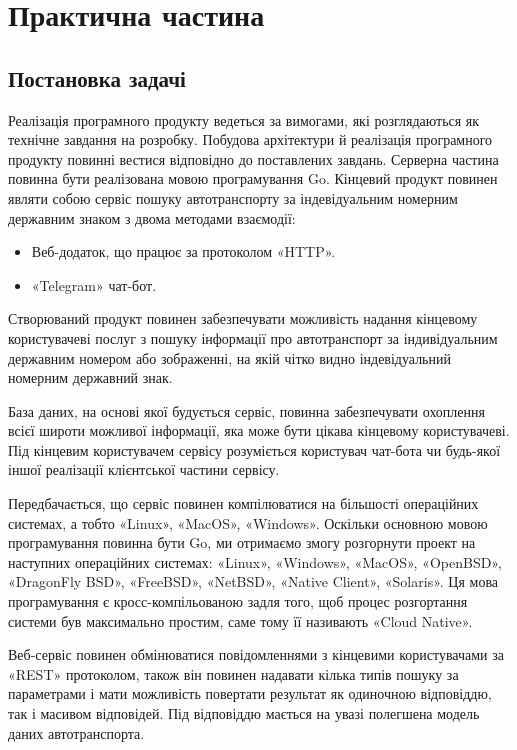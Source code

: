 
\chapter{Практична частина}

\section{Постановка задачі}

Реалізація програмного продукту ведеться за вимогами, які розглядаються як технічне завдання на розробку. Побудова архітектури й реалізація програмного
продукту повинні вестися відповідно до поставлених завдань.
Серверна частина повинна бути реалізована мовою програмування Go.
Кінцевий продукт повинен являти собою сервіс пошуку автотранспорту
за індевідуальним номерним державним знаком з двома методами
взаємодії:

\begin{itemize}
  \item Веб-додаток, що працює за протоколом «HTTP».
  \item «Telegram» чат-бот.
\end{itemize}

Створюваний продукт повинен забезпечувати можливість
надання кінцевому користувачеві послуг з пошуку інформації про
автотранспорт за індивідуальним державним номером
або зображенні, на якій чітко видно
індевідуальний номерним державний знак.

База даних, на основі якої будується сервіс, повинна
забезпечувати охоплення всієї широти можливої ​​інформації, яка може бути
цікава кінцевому користувачеві. Під кінцевим користувачем сервісу
розуміється користувач чат-бота чи будь-якої іншої реалізації клієнтської частини сервісу.

Передбачається, що сервіс повинен компілюватися на більшості операційних системах,
а тобто «Linux», «MacOS», «Windows».
Оскільки основною мовою програмування повинна бути Go, ми отримаємо змогу
розгорнути проект на наступних операційних системах:
«Linux», «Windows», «MacOS», «OpenBSD», «DragonFly BSD», «FreeBSD», «NetBSD», «Native Client», «Solaris».
Ця мова програмування є кросс-компільованою задля того, щоб процес розгортання
системи був максимально простим, саме тому її називають «Cloud Native».

Веб-сервіс повинен обмінюватися повідомленнями з кінцевими
користувачами за «REST» протоколом, також він повинен
надавати кілька типів пошуку за параметрами і мати можливість
повертати результат як одиночною відповіддю, так і масивом відповідей.
Під відповіддю мається на увазі полегшена модель даних автотранспорта.

